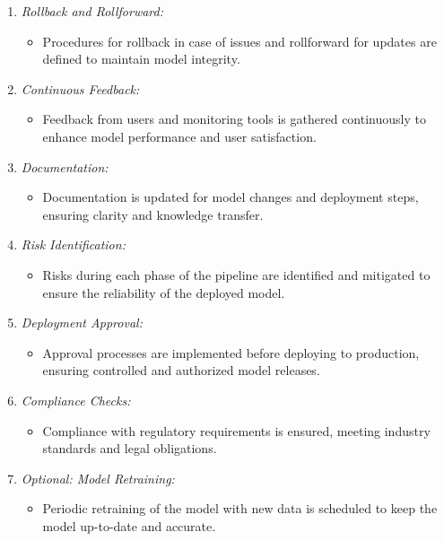 \documentclass[12pt, letterpaper]{article}
\begin{document}
\begin{enumerate}
    \item \textit{Rollback and Rollforward:}
    \begin{itemize}
        \item Procedures for rollback in case of issues and rollforward for updates are defined to maintain model integrity.
    \end{itemize}
    
    \item \textit{Continuous Feedback:}
    \begin{itemize}
        \item Feedback from users and monitoring tools is gathered continuously to enhance model performance and user satisfaction.
    \end{itemize}
    
    \item \textit{Documentation:}
    \begin{itemize}
        \item Documentation is updated for model changes and deployment steps, ensuring clarity and knowledge transfer.
    \end{itemize}
    
    \item \textit{Risk Identification:}
    \begin{itemize}
        \item Risks during each phase of the pipeline are identified and mitigated to ensure the reliability of the deployed model.
    \end{itemize}
    
    \item \textit{Deployment Approval:}
    \begin{itemize}
        \item Approval processes are implemented before deploying to production, ensuring controlled and authorized model releases.
    \end{itemize}
    
    \item \textit{Compliance Checks:}
    \begin{itemize}
        \item Compliance with regulatory requirements is ensured, meeting industry standards and legal obligations.
    \end{itemize}
    
    \item \textit{Optional: Model Retraining:}
    \begin{itemize}
        \item Periodic retraining of the model with new data is scheduled to keep the model up-to-date and accurate.
    \end{itemize}
    

\end{enumerate}
\end{document}

